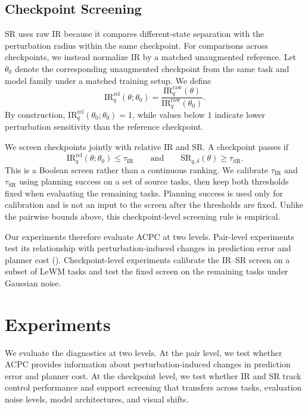 \documentclass{article}
\begin{document}
\subsection{Checkpoint Screening}
\label{sec:checkpoint-threshold-selection}

SR uses raw IR because it compares different-state separation with the
perturbation radius within the same checkpoint. For comparisons across
checkpoints, we instead normalize IR by a matched unaugmented reference. Let
$\theta_0$ denote the corresponding unaugmented checkpoint from the same task
and model family under a matched training setup. We define
\begin{equation}
\mathrm{IR}^{\mathrm{rel}}_{q}(\theta;\theta_0)
=
\frac{\mathrm{IR}^{\mathrm{raw}}_{q}(\theta)}
{\mathrm{IR}^{\mathrm{raw}}_{q}(\theta_0)}.
\label{eq:ir-relative}
\end{equation}
By construction, $\mathrm{IR}^{\mathrm{rel}}_{q}(\theta_0;\theta_0)=1$, while
values below $1$ indicate lower perturbation sensitivity than the reference
checkpoint.

We screen checkpoints jointly with relative IR and SR. A checkpoint passes if
\[
\mathrm{IR}^{\mathrm{rel}}_{q}(\theta;\theta_0)
\leq \tau_{\mathrm{IR}}
\qquad\text{and}\qquad
\mathrm{SR}_{q,\delta}(\theta)
\geq \tau_{\mathrm{SR}}.
\]
This is a Boolean screen rather than a continuous ranking. We calibrate
$\tau_{\mathrm{IR}}$ and $\tau_{\mathrm{SR}}$ using planning success on a set
of source tasks, then keep both thresholds fixed when evaluating the remaining
tasks. Planning success is used only for calibration and is not an input to
the screen after the thresholds are fixed. Unlike the pairwise bounds above,
this checkpoint-level screening rule is empirical.

Our experiments therefore evaluate ACPC at two levels. Pair-level experiments
test its relationship with perturbation-induced changes in prediction error
and planner cost ().
Checkpoint-level experiments calibrate the IR--SR screen on a subset of LeWM
tasks and test the fixed screen on the remaining tasks under Gaussian noise.


\section{Experiments}\label{sec:exp}
We evaluate the diagnostics at two levels. At the pair level, we test whether
ACPC provides information about perturbation-induced changes in prediction
error and planner cost. At the checkpoint level, we test whether IR and SR
track control performance and support screening that transfers across tasks,
evaluation noise levels, model architectures, and visual shifts.
\end{document}
